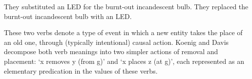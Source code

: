 \documentclass[output=paper
 	        ,biblatex
                ,babelshorthands
                ,newtxmath
                ,draftmode
                ,colorlinks, citecolor=brown
]{langscibook}
\begin{document}
\begin{exe}
\ex\label{subrep}
\begin{xlist}
\ex\label{subrepa}They substituted an LED for the burnt-out incandescent bulb.
\ex\label{subrepb}They replaced the burnt-out incandescent bulb with an LED.
\end{xlist}
\end{exe}

\noindent
These two verbs denote a type of event in which a new entity takes the place of an old one, through (typically intentional) causal action.
Koenig and Davis decompose both verb meanings into two simpler actions of removal and placement: `x removes y (from g)' and `x places z (at g)', each represented as an elementary predication in the  values of these verbs.  
\end{document}
